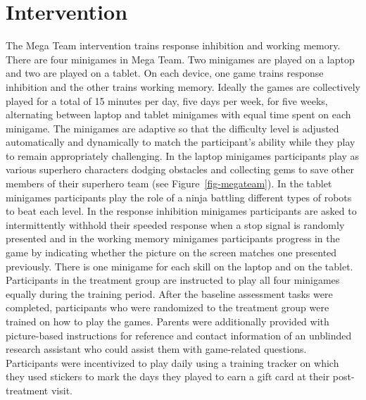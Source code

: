 \documentclass[
  letterpaper,
]{ut-thesis}
\begin{document}
\section{Intervention}\label{intervention}

The Mega Team intervention trains response inhibition and working
memory. There are four minigames in Mega Team. Two minigames are played
on a laptop and two are played on a tablet. On each device, one game
trains response inhibition and the other trains working memory. Ideally
the games are collectively played for a total of 15 minutes per day,
five days per week, for five weeks, alternating between laptop and
tablet minigames with equal time spent on each minigame. The minigames
are adaptive so that the difficulty level is adjusted automatically and
dynamically to match the participant's ability while they play to remain
appropriately challenging. In the laptop minigames participants play as
various superhero characters dodging obstacles and collecting gems to
save other members of their superhero team (see
Figure~\ref{fig-megateam}). In the tablet minigames participants play
the role of a ninja battling different types of robots to beat each
level. In the response inhibition minigames participants are asked to
intermittently withhold their speeded response when a stop signal is
randomly presented and in the working memory minigames participants
progress in the game by indicating whether the picture on the screen
matches one presented previously. There is one minigame for each skill
on the laptop and on the tablet. Participants in the treatment group are
instructed to play all four minigames equally during the training
period. After the baseline assessment tasks were completed, participants
who were randomized to the treatment group were trained on how to play
the games. Parents were additionally provided with picture-based
instructions for reference and contact information of an unblinded
research assistant who could assist them with game-related questions.
Participants were incentivized to play daily using a training tracker on
which they used stickers to mark the days they played to earn a gift
card at their post-treatment visit.
\end{document}

